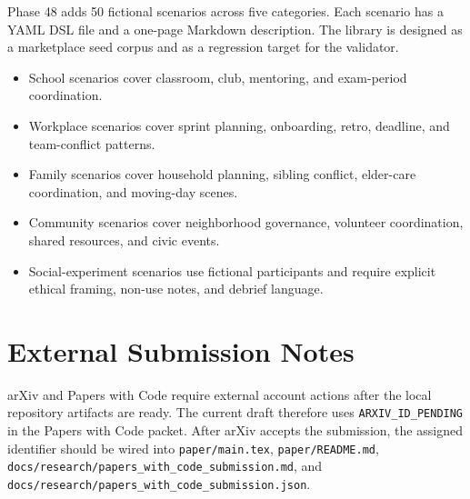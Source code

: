 Phase 48 adds 50 fictional scenarios across five categories. Each scenario has a YAML DSL file and a one-page Markdown description. The library is designed as a marketplace seed corpus and as a regression target for the validator.



\begin{itemize}
  \item School scenarios cover classroom, club, mentoring, and exam-period coordination.
  \item Workplace scenarios cover sprint planning, onboarding, retro, deadline, and team-conflict patterns.
  \item Family scenarios cover household planning, sibling conflict, elder-care coordination, and moving-day scenes.
  \item Community scenarios cover neighborhood governance, volunteer coordination, shared resources, and civic events.
  \item Social-experiment scenarios use fictional participants and require explicit ethical framing, non-use notes, and debrief language.
\end{itemize}

\section{External Submission Notes}

arXiv and Papers with Code require external account actions after the local repository artifacts are ready. The current draft therefore uses \texttt{ARXIV\_ID\_PENDING} in the Papers with Code packet. After arXiv accepts the submission, the assigned identifier should be wired into \texttt{paper/main.tex}, \texttt{paper/README.md}, \texttt{docs/research/papers\_with\_code\_submission.md}, and \texttt{docs/research/papers\_with\_code\_submission.json}.
